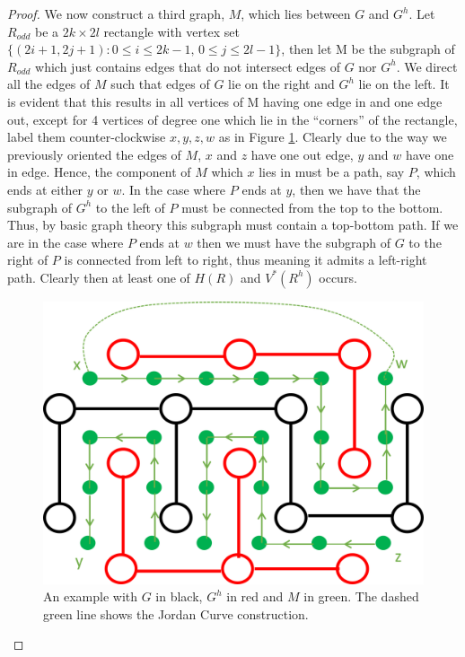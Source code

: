 \documentclass[a4paper,11pt]{article}
\theoremstyle{definition}
\begin{document}
\begin{proof}
	We now construct a third graph, $M$, which lies between $G$ and $G^h$. Let $R_{odd}$ be a $2k\times 2l$ rectangle with vertex set $\{(2i+1,2j+1): 0 \leq i \leq 2k-1 \text{, } 0 \leq j \leq 2l-1 \}$, then let M be the subgraph of $R_{odd}$ which just contains edges that do not intersect edges of $G$ nor $G^h$. We direct all the edges of $M$ such that edges of $G$ lie on the right and $G^h$ lie on the left. It is evident that this results in all vertices of M having one edge in and one edge out, except for 4 vertices of degree one which lie in the ``corners'' of the rectangle, label them counter-clockwise $x,y,z,w$ as in Figure \ref*{fig:rectangleProof}. Clearly due to the way we previously oriented the edges of $M$, $x$ and $z$ have one out edge, $y$ and $w$ have one in edge. Hence, the component of $M$ which $x$ lies in must be a path, say $P$, which ends at either $y$ or $w$. In the case where $P$ ends at $y$, then we have that the subgraph of $G^h$ to the left of $P$ must be connected from the top to the bottom. Thus, by basic graph theory this subgraph must contain a top-bottom path. If we are in the case where $P$ ends at $w$ then we must have the subgraph of $G$ to the right of $P$ is connected from left to right, thus meaning it admits a left-right path. Clearly then at least one of $H(R)$ and $V^*(R^h)$ occurs.
	\begin{figure}
		\centering
		\includegraphics[scale=0.6]{drawings/rectanglesproof.png}
		\caption{An example with $G$ in black, $G^h$ in red and $M$ in green. The dashed green line shows the Jordan Curve construction.}
		\label{fig:rectangleProof}
	\end{figure}

\end{proof}
\end{document}
